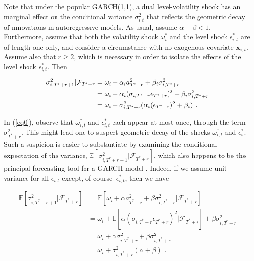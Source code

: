\documentclass[11pt]{article}
\newcommand{\x}{\textbf{x}}
\theoremstyle{definition}
\begin{document}
Note that under the popular GARCH(1,1), a dual level-volatility shock has an marginal effect on the conditional variance $\sigma^{2}_{i,t}$ that reflects the geometric decay of innovations in autoregressive models.  As usual, assume $\alpha+\beta < 1$.  Furthermore, assume that both the volatility shock $\omega^{*}_{i}$ and the level shock $\epsilon^{*}_{i,t}$ are of length one only, and consider a circumstance with no exogenous covariate $\x_{i,t}$. Assume also that $r\geq 2$, which is necessary in order to isolate the effects of the level shock $\epsilon^{*}_{i,t}$.  Then

\begin{align}
\sigma^{2}_{i,T^{*}+r+1} | \mathcal{F}_{T^{*}+r} & = \omega_{i} + \alpha_{i} a_{T^{*}+r}^{2} + \beta_{i}\sigma^{2}_{i,T^{*}+r} \label{eq0}\\
& = \omega_{i} + \alpha_{i}(\sigma_{i,T^{*}+r}\epsilon_{T^{*}+r})^{2} + \beta_{i}\sigma^{2}_{i,T^{*}+r}\notag \\
& = \omega_{i} + \sigma^{2}_{i,T^{*}+r}(\alpha_{i} (\epsilon_{T^{*}+r})^{2} + \beta_{i}) \text{ .}\notag 
\end{align}

In (\ref{eq0}), observe that $\omega_{i,t}^{*}$ and $\epsilon^{*}_{i,t}$ each appear at most once, through the term $\sigma^{2}_{T^{*}+r}$.  This might lead one to suspect  geometric decay of the shocks $\omega_{i,t}^{*}$ and $\epsilon^{*}_{i}$.  Such a suspicion is easier to substantiate by examining the conditional expectation of the variance, $\mathbb{E}[ \sigma^{2}_{i,T^{*}+r+1} |\mathcal{F}_{T^{*}+r}]$, which also happens to be the principal forecasting tool for a GARCH model \citep{zivot2009practical}.  Indeed, if we assume unit variance for all $\epsilon_{i,t}$ except, of course, $\epsilon^{*}_{i,t}$, then we have

\begin{align*}
\mathbb{E}[ \sigma^{2}_{i,T^{*}+r+1} |\mathcal{F}_{T^{*}+r}] & = \mathbb{E}[\omega_{i} + \alpha a_{T^{*}+r}^{2} + \beta\sigma^{2}_{i,T^{*}+r} |\mathcal{F}_{T^{*}+r}] \\
& = \omega_{i} + \mathbb{E}[\alpha(\sigma_{i,T^{*}+r}\epsilon_{T^{*}+r})^{2} |\mathcal{F}_{T^{*}+r}] + \beta\sigma^{2}_{i,T^{*}+r} \\
& = \omega_{i} + \alpha\sigma_{i,T^{*}+r}^{2} + \beta\sigma^{2}_{i,T^{*}+r} \tag{Due to the unit variance assumption}\\
& = \omega_{i} + \sigma^{2}_{i,T^{*}+r}(\alpha + \beta) \text{ .} \\
\end{align*}
\end{document}
